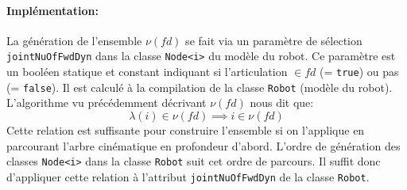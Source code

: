 \documentclass{report}
\begin{document}
\paragraph{Implémentation:}
La génération de l'ensemble $\nu(fd)$ se fait via un paramètre de sélection \verb;jointNuOfFwdDyn; dans la classe \verb;Node<i>; du modèle du robot. Ce paramètre est un booléen statique et constant indiquant si l'articulation $\in fd$ (= \verb;true;) ou pas (= \verb;false;). Il est calculé à la compilation de la classe \verb;Robot; (modèle du robot). L'algorithme vu précédemment décrivant $\nu(fd)$ nous dit que:
\begin{equation*}
\lambda(i) \in \nu(fd) \implies i \in \nu(fd)
\end{equation*}
Cette relation est suffisante pour construire l'ensemble si on l'applique en parcourant l'arbre cinématique en profondeur d'abord. L'ordre de génération des classes \verb;Node<i>; dans la classe \verb;Robot; suit cet ordre de parcours. Il suffit donc d'appliquer cette relation à l'attribut \verb;jointNuOfFwdDyn; de la classe \verb;Robot;.
\end{document}
